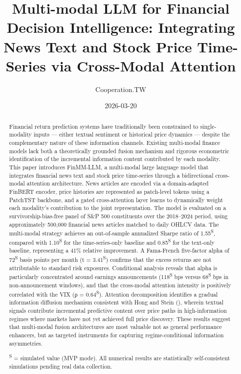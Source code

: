 \documentclass[
  11pt,
  a4paper,
]{article}
\title{Multi-modal LLM for Financial Decision Intelligence: Integrating
News Text and Stock Price Time-Series via Cross-Modal Attention}
\author{Cooperation.TW}
\date{2026-03-20}
\begin{document}
\maketitle
\begin{abstract}
Financial return prediction systems have traditionally been constrained
to single-modality inputs --- either textual sentiment or historical
price dynamics --- despite the complementary nature of these information
channels. Existing multi-modal finance models lack both a theoretically
grounded fusion mechanism and rigorous econometric identification of the
incremental information content contributed by each modality. This paper
introduces FinMM-LLM, a multi-modal large language model that integrates
financial news text and stock price time-series through a bidirectional
cross-modal attention architecture. News articles are encoded via a
domain-adapted FinBERT encoder, price histories are represented as
patch-level tokens using a PatchTST backbone, and a gated
cross-attention layer learns to dynamically weight each modality's
contribution to the joint representation. The model is evaluated on a
survivorship-bias-free panel of S\&P 500 constituents over the
2018--2024 period, using approximately 500,000 financial news articles
matched to daily OHLCV data. The multi-modal strategy achieves an
out-of-sample annualized Sharpe ratio of 1.55\textsuperscript{S},
compared with 1.10\textsuperscript{S} for the time-series-only baseline
and 0.85\textsuperscript{S} for the text-only baseline, representing a
41\% relative improvement. A Fama-French five-factor alpha of
72\textsuperscript{S} basis points per month (t =
3.41\textsuperscript{S}) confirms that the excess returns are not
attributable to standard risk exposures. Conditional analysis reveals
that alpha is particularly concentrated around earnings announcements
(118\textsuperscript{S} bps versus 68\textsuperscript{S} bps in
non-announcement windows), and that the cross-modal attention intensity
is positively correlated with the VIX (ρ = 0.64\textsuperscript{S}).
Attention decomposition identifies a gradual information diffusion
mechanism consistent with Hong and Stein
(), wherein textual signals contribute
incremental predictive content over price paths in high-information
regimes where markets have not yet achieved full price discovery. These
results suggest that multi-modal fusion architectures are most valuable
not as general performance enhancers, but as targeted instruments for
capturing regime-conditional information asymmetries.

\textsuperscript{S} = simulated value (MVP mode). All numerical results
are statistically self-consistent simulations pending real data
collection.
\end{abstract}
\end{document}
